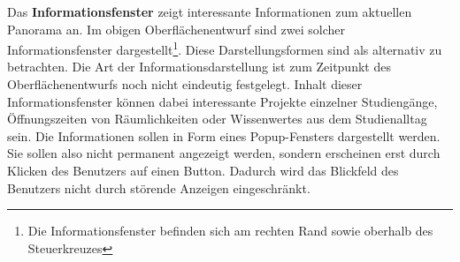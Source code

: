 Das \textbf{Informationsfenster} zeigt interessante Informationen zum aktuellen
Panorama an. Im obigen Oberflächenentwurf sind zwei solcher Informationsfenster
dargestellt\footnote{Die Informationsfenster befinden sich am rechten Rand
sowie oberhalb des Steuerkreuzes}. Diese Darstellungsformen sind als alternativ
zu betrachten. Die Art der Informationsdarstellung ist zum Zeitpunkt des
Oberflächenentwurfs noch nicht eindeutig festgelegt. Inhalt dieser
Informationsfenster können dabei interessante Projekte einzelner Studiengänge,
Öffnungszeiten von Räumlichkeiten oder Wissenwertes aus dem Studienalltag sein.
Die Informationen sollen in Form eines Popup-Fensters dargestellt werden. Sie
sollen also nicht permanent angezeigt werden, sondern erscheinen erst durch
Klicken des Benutzers auf einen Button. Dadurch wird das Blickfeld des Benutzers
nicht durch störende Anzeigen eingeschränkt.
